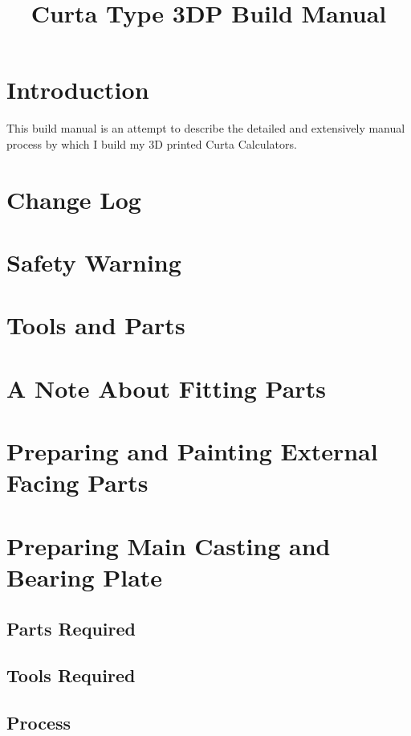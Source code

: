 \documentclass{article}
\title{Curta Type 3DP Build Manual}
\date{}
\begin{document}
\maketitle

\tableofcontents

\newpage

\section{Introduction}
This build manual is an attempt to describe the detailed and extensively manual process by which
I build my 3D printed Curta Calculators.


\section{Change Log}

\section{Safety Warning}


\section{Tools and Parts}

\section{A Note About Fitting Parts}

\section{Preparing and Painting External Facing Parts}


\section{Preparing Main Casting and Bearing Plate}
\subsection{Parts Required}

\subsection{Tools Required}

\subsection{Process}
\end{document}
